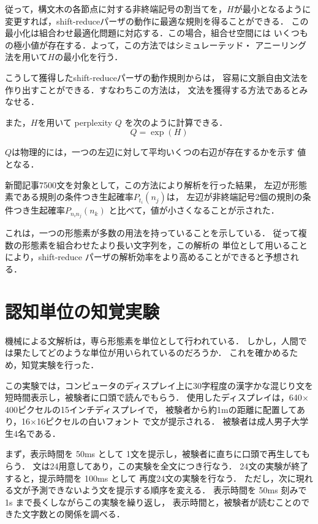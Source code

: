 従って，構文木の各節点に対する非終端記号の割当てを，\hspace*{-1mm}$H$が最小となるように
変更すれば，shift-reduceパーザの動作に最適な規則を得ることができる．
\hspace*{-2mm}この最小化は組合わせ最適化問題に対応する．この場合，組合せ空間には
いくつもの極小値が存在する．よって，この方法ではシミュレーテッド・
アニーリング法を用いて$H$の最小化を行う\cite{patr}．

こうして獲得したshift-reduceパーザの動作規則からは，
容易に文脈自由文法を作り出すことができる．すなわちこの方法は，
文法を獲得する方法であるとみなせる．

また，$H$を用いて perplexity $Q$ を次のように計算できる．
\vspace*{-2mm}
\begin{equation}
Q = \exp (H) \label{eq6}
\end{equation}

$Q$は物理的には，一つの左辺に対して平均いくつの右辺が存在するかを示す
値となる．


新聞記事7500文を対象として，この方法により解析を行った結果，
左辺が形態素である規則の条件つき生起確率$P_{t_i}(n_j)$は，
左辺が非終端記号2個の規則の条件つき生起確率$P_{n_in_j}(n_k)$
と比べて，値が小さくなることが示された\cite{yoko2}．

これは，一つの形態素が多数の用法を持っていることを示している．
従って複数の形態素を組合わせたより長い文字列を，この解析の
単位として用いることにより，shift-reduce
パーザの解析効率をより高めることができると予想される．

\section{認知単位の知覚実験}

機械による文解析は，専ら形態素を単位として行われている\cite{taka}．
しかし，人間では果たしてどのような単位が用いられているのだろうか．
これを確かめるため，知覚実験を行った．

この実験では，コンピュータのディスプレイ上に30字程度の漢字かな混じり文を
短時間表示し，被験者に口頭で読んでもらう．
使用したディスプレイは，640$\times$400ピクセルの15インチディスプレイで，
被験者から約1mの距離に配置してあり，16$\times$16ピクセルの白いフォント
で文が提示される．
被験者は成人男子大学生4名である．

まず，表示時間を 50ms として
1文を提示し，被験者に直ちに口頭で再生してもらう．
文は24用意してあり，この実験を全文につき行なう．
24文の実験が終了すると，提示時間を 100ms として
再度24文の実験を行なう．
ただし，次に現れる文が予測できないよう文を提示する順序を変える．
表示時間を 50ms 刻みで 1s まで長くしながらこの実験を繰り返し，
表示時間と，被験者が読むことのできた文字数との関係を調べる．

